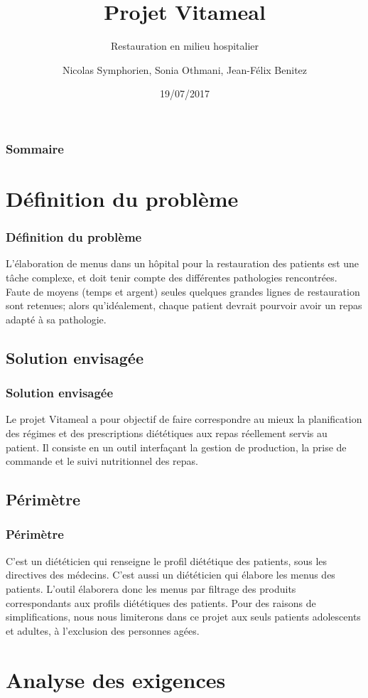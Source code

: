 \documentclass{beamer}
\title{Projet Vitameal}
\subtitle{Restauration en milieu hospitalier}
\author{Nicolas Symphorien, Sonia Othmani, Jean-Félix Benitez}
\institute{CNAM}
\date{19/07/2017}
\begin{document}
\begin{frame}[plain]
  \titlepage
\end{frame}

\begin{frame}
  \frametitle{Sommaire}
  \tableofcontents
\end{frame}

\section{Définition du problème}
\begin{frame}[label=definitionDuProbleme]
\frametitle{Définition du problème}
L'élaboration de menus dans un hôpital pour la restauration des patients
est une tâche complexe, et doit tenir compte des différentes pathologies
rencontrées. Faute de moyens (temps et argent) seules quelques grandes
lignes de restauration sont retenues; alors qu'idéalement, chaque
patient devrait pourvoir avoir un repas adapté à sa pathologie.
\end{frame}

\subsection{Solution envisagée}
\begin{frame}[label=solutionEnvisagée]
\frametitle{Solution envisagée}
Le projet Vitameal a pour objectif de faire correspondre au mieux la planification des régimes et des
prescriptions diététiques aux repas réellement servis au patient. Il consiste en un outil interfaçant la
gestion de production, la prise de commande et le suivi nutritionnel des repas.
\end{frame}

\subsection{Périmètre}
\begin{frame}[label=perimetre]
\frametitle{Périmètre}
C'est un diététicien qui renseigne le profil diététique des patients,
sous les directives des médecins. C'est aussi un diététicien qui élabore
les menus des patients. L'outil élaborera donc
les menus par filtrage des produits correspondants aux profils
diététiques des patients. Pour des raisons de simplifications, nous nous limiterons dans ce projet aux seuls patients adolescents et adultes, à l'exclusion des personnes agées.
\end{frame}

\section{Analyse des exigences}
\end{document}
